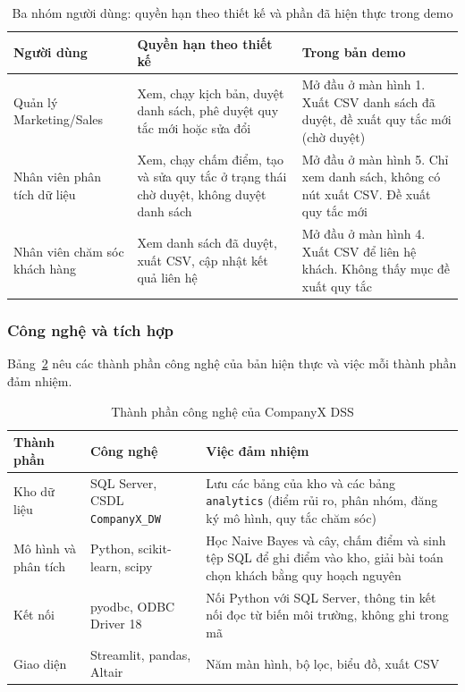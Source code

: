 \begin{table}[!htbp]
\centering
\caption{Ba nhóm người dùng: quyền hạn theo thiết kế và phần đã hiện thực trong demo}
\label{tab:quyen}
\footnotesize
\begin{tabular}{p{3.0cm}p{5.4cm}p{6.0cm}}
\toprule
Người dùng & Quyền hạn theo thiết kế & Trong bản demo \\
\midrule
Quản lý Marketing/Sales & Xem, chạy kịch bản, duyệt danh sách, phê duyệt quy tắc mới hoặc sửa đổi & Mở đầu ở màn hình 1. Xuất CSV danh sách đã duyệt, đề xuất quy tắc mới (chờ duyệt) \\
Nhân viên phân tích dữ liệu & Xem, chạy chấm điểm, tạo và sửa quy tắc ở trạng thái chờ duyệt, không duyệt danh sách & Mở đầu ở màn hình 5. Chỉ xem danh sách, không có nút xuất CSV. Đề xuất quy tắc mới \\
Nhân viên chăm sóc khách hàng & Xem danh sách đã duyệt, xuất CSV, cập nhật kết quả liên hệ & Mở đầu ở màn hình 4. Xuất CSV để liên hệ khách. Không thấy mục đề xuất quy tắc \\
\bottomrule
\end{tabular}
\end{table}

\subsubsection{Công nghệ và tích hợp}\label{sec:congnghe}
Bảng~\ref{tab:congnghe} nêu các thành phần công nghệ của bản hiện thực và việc mỗi thành phần đảm nhiệm.

\begin{table}[!htbp]
\centering
\caption{Thành phần công nghệ của CompanyX DSS}
\label{tab:congnghe}
\footnotesize
\begin{tabular}{p{3.3cm}p{4.2cm}p{7.2cm}}
\toprule
Thành phần & Công nghệ & Việc đảm nhiệm \\
\midrule
Kho dữ liệu & SQL Server, CSDL \texttt{CompanyX\_DW} & Lưu các bảng của kho và các bảng \texttt{analytics} (điểm rủi ro, phân nhóm, đăng ký mô hình, quy tắc chăm sóc) \\
Mô hình và phân tích & Python, scikit-learn, scipy & Học Naive Bayes và cây, chấm điểm và sinh tệp SQL để ghi điểm vào kho, giải bài toán chọn khách bằng quy hoạch nguyên \\
Kết nối & pyodbc, ODBC Driver 18 & Nối Python với SQL Server, thông tin kết nối đọc từ biến môi trường, không ghi trong mã \\
Giao diện & Streamlit, pandas, Altair & Năm màn hình, bộ lọc, biểu đồ, xuất CSV \\
\bottomrule
\end{tabular}
\end{table}

